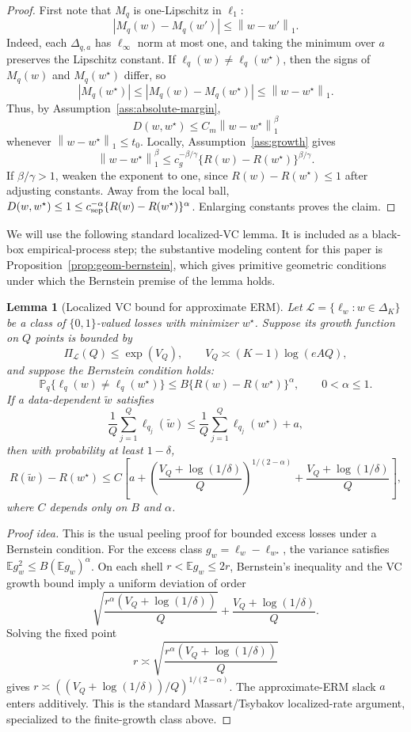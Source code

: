 \documentclass[11pt]{article}
\newtheorem{lemma}{Lemma}
\newcommand{\E}{\mathbb E}
\newcommand{\Pp}{\mathbb P}
\newcommand{\wstar}{w^\star}
\newcommand{\norm}[1]{\left\lVert #1\right\rVert}
\begin{document}
\begin{proof}
First note that $M_q$ is one-Lipschitz in $\ell_1$:
\[
|M_q(w)-M_q(w')|
\le
\norm{w-w'}_1.
\]
Indeed, each $\Delta_{q,a}$ has $\ell_\infty$ norm at most one, and taking the minimum over $a$ preserves the Lipschitz constant.  If $\ell_q(w)\ne\ell_q(\wstar)$, then the signs of $M_q(w)$ and $M_q(\wstar)$ differ, so
\[
|M_q(\wstar)|
\le
|M_q(w)-M_q(\wstar)|
\le
\norm{w-\wstar}_1.
\]
Thus, by Assumption~\ref{ass:absolute-margin},
\[
D(w,\wstar)
\le
C_m\norm{w-\wstar}_1^\beta
\]
whenever $\norm{w-\wstar}_1\le t_0$.  Locally, Assumption~\ref{ass:growth} gives
\[
\norm{w-\wstar}_1^\beta
\le
c_g^{-\beta/\gamma}
\{R(w)-R(\wstar)\}^{\beta/\gamma}.
\]
If $\beta/\gamma>1$, weaken the exponent to one, since $R(w)-R(\wstar)\le 1$ after adjusting constants.  Away from the local ball, $D(w,\wstar)\le1\le c_{\rm sep}^{-\alpha}\{R(w)-R(\wstar)\}^{\alpha}$.  Enlarging constants proves the claim.
\end{proof}

We will use the following standard localized-VC lemma.  It is included as a black-box empirical-process step; the substantive modeling content for this paper is Proposition~\ref{prop:geom-bernstein}, which gives primitive geometric conditions under which the Bernstein premise of the lemma holds.

\begin{lemma}[Localized VC bound for approximate ERM]
\label{lem:localized-vc}
Let $\mathcal L=\{\ell_w:w\in\Delta_K\}$ be a class of $\{0,1\}$-valued losses with minimizer $\wstar$.  Suppose its growth function on $Q$ points is bounded by
\[
\Pi_{\mathcal L}(Q)\le \exp(V_Q),
\qquad
V_Q\asymp (K-1)\log(eAQ),
\]
and suppose the Bernstein condition holds:
\[
\Pp_q\{\ell_q(w)\ne\ell_q(\wstar)\}
\le
B\{R(w)-R(\wstar)\}^{\alpha},
\qquad 0<\alpha\le 1.
\]
If a data-dependent $\widetilde w$ satisfies
\[
\frac1Q\sum_{j=1}^Q\ell_{q_j}(\widetilde w)
\le
\frac1Q\sum_{j=1}^Q\ell_{q_j}(\wstar)+a,
\]
then with probability at least $1-\delta$,
\[
R(\widetilde w)-R(\wstar)
\le
C
\left[
 a
 +
\left(\frac{V_Q+\log(1/\delta)}{Q}\right)^{1/(2-\alpha)}
+
\frac{V_Q+\log(1/\delta)}{Q}
\right],
\]
where $C$ depends only on $B$ and $\alpha$.
\end{lemma}

\begin{proof}[Proof idea]
This is the usual peeling proof for bounded excess losses under a Bernstein condition.  For the excess class $g_w=\ell_w-\ell_{\wstar}$, the variance satisfies $\E g_w^2\le B(\E g_w)^\alpha$.  On each shell $r<\E g_w\le2r$, Bernstein's inequality and the VC growth bound imply a uniform deviation of order
\[
\sqrt{\frac{r^\alpha(V_Q+\log(1/\delta))}{Q}}
+
\frac{V_Q+\log(1/\delta)}{Q}.
\]
Solving the fixed point
\[
r\asymp
\sqrt{\frac{r^\alpha(V_Q+\log(1/\delta))}{Q}}
\]
gives $r\asymp((V_Q+\log(1/\delta))/Q)^{1/(2-\alpha)}$.  The approximate-ERM slack $a$ enters additively.  This is the standard Massart/Tsybakov localized-rate argument, specialized to the finite-growth class above.
\end{proof}
\end{document}
